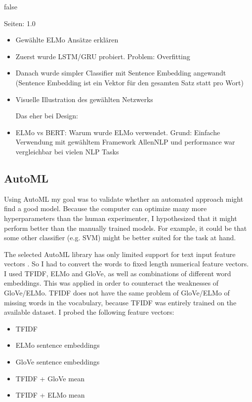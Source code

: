 \documentclass[draft,final,oneside]{vutinfth} %
\begin{document}
\if false

Seiten: 1.0

\begin{itemize}
\item Gewählte ELMo Ansätze erklären
\item Zuerst wurde LSTM/GRU probiert. Problem: Overfitting
\item Danach wurde simpler Classifier mit Sentence Embedding angewandt (Sentence Embedding ist ein Vektor für den gesamten Satz statt pro Wort)
\item Visuelle Illustration des gewählten Netzwerks

Das eher bei Design:
\item ELMo vs BERT: Warum wurde ELMo verwendet. Grund: Einfache Verwendung mit gewähltem Framework AllenNLP und performance war vergleichbar bei vielen NLP Tasks
\end{itemize}
\fi

\subsection{AutoML}

Using AutoML my goal was to validate whether an automated approach might find a good model. Because the computer can optimize many more hyperparameters than the human experimenter, I hypothesized that it might perform better than the manually trained models. For example, it could be that some other classifier (e.g. SVM) might be better suited for the task at hand.

The selected AutoML library has only limited support for text input feature vectors \cite{hyperopt}. So I had to convert the words to fixed length numerical feature vectors. I used TFIDF, ELMo and GloVe, as well as combinations of different word embeddings. This was applied in order to counteract the weaknesses of GloVe/ELMo. TFIDF does not have the same problem of GloVe/ELMo of missing words in the vocabulary, because TFIDF was entirely trained on the available dataset. I probed the following feature vectors:

\begin{itemize}

\item TFIDF
\item ELMo sentence embeddings
\item GloVe sentence embeddings
\item TFIDF + GloVe mean
\item TFIDF + ELMo mean

\end{itemize}
\end{document}
